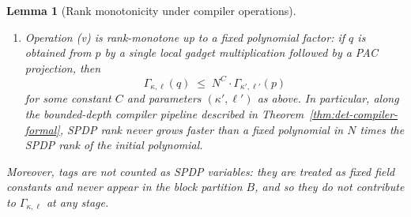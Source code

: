 \documentclass[12pt]{article}
\newtheorem{lemma}[theorem]{Lemma}
\theoremstyle{definition}
\theoremstyle{definition}
\theoremstyle{remark}
\theoremstyle{remark}
\begin{document}
\begin{lemma}[Rank monotonicity under compiler operations]
\begin{enumerate}[label=(\alph*)]
  \item Operation \textup{(v)} is rank-monotone up to a fixed polynomial
  factor: if $q$ is obtained from $p$ by a single local gadget
  multiplication followed by a PAC projection, then
  \[
     \Gamma_{\kappa,\ell}(q) \;\le\; N^C \cdot \Gamma_{\kappa',\ell'}(p)
  \]
  for some constant $C$ and parameters $(\kappa',\ell')$ as above. In
  particular, along the bounded-depth compiler pipeline described in
  Theorem~\ref{thm:det-compiler-formal}, SPDP rank never grows faster than
  a fixed polynomial in $N$ times the SPDP rank of the initial polynomial.
\end{enumerate}
Moreover, tags are not counted as SPDP variables: they are treated as
fixed field constants and never appear in the block partition $B$, and so
they do not contribute to $\Gamma_{\kappa,\ell}$ at any stage.
\end{lemma}
\end{document}

